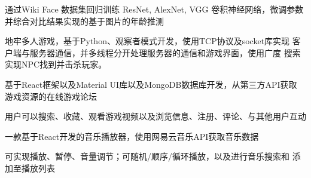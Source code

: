 \documentclass[]{deedy-resume-openfont}
\begin{document}
\begin{minipage}[t]{0.73\textwidth}
\sectionsep

\begin{tightemize}
    \item 通过Wiki Face 数据集回归训练 ResNet, AlexNet, VGG 卷积神经网络，微调参数并综合对比结果实现的基于图片的年龄推测
    \end{tightemize}

\sectionsep

\begin{tightemize}
    \item 地牢多人游戏，基于Python、观察者模式开发，使用TCP协议及socket库实现
    客户端与服务器通信，并多线程分开处理服务器的通信和游戏界面，使用广度
    搜索实现NPC找到并击杀玩家。
    \end{tightemize}

\sectionsep

\begin{tightemize}
    \item 基于React框架以及Material UI库以及MongoDB数据库开发，从第三方API获取
    游戏资源的在线游戏论坛
    \item 用户可以搜索、收藏、观看游戏视频以及浏览信息、注册、评论、与其他用户互动
    \end{tightemize}
    
\sectionsep

\begin{tightemize}
    \item 一款基于React开发的音乐播放器，使用网易云音乐API获取音乐数据
    \item 可实现播放、暂停、音量调节；可随机/顺序/循环播放，以及进行音乐搜索和
    添加至播放列表
    \end{tightemize}





% 
% 

\end{minipage} 
\end{document}

